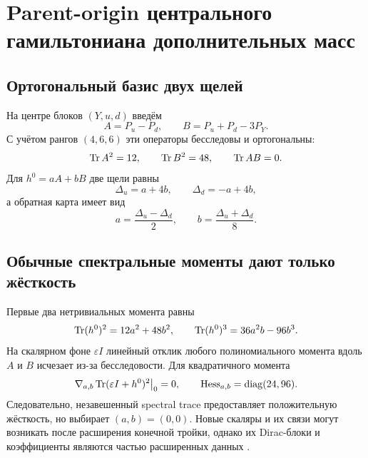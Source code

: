 \chapter{Parent-origin центрального гамильтониана дополнительных масс}
\label{ch:v8-extra-mass-central-hamiltonian-parent-origin}

\section{Ортогональный базис двух щелей}

На центре блоков $(Y,u,d)$ введём
\begin{equation}
 A=P_u-P_d,\qquad B=P_u+P_d-3P_Y.
 \label{eq:v8-extra-mass-origin-basis}
\end{equation}
С учётом рангов $(4,6,6)$ эти операторы бесследовы и ортогональны:
\begin{equation}
 \operatorname{Tr} A^2=12,\qquad \operatorname{Tr} B^2=48,\qquad \operatorname{Tr} AB=0.
 \label{eq:v8-extra-mass-origin-gram}
\end{equation}
Для $h^0=aA+bB$ две щели равны
\begin{equation}
 \Delta_u=a+4b,\qquad \Delta_d=-a+4b,
 \label{eq:v8-extra-mass-origin-gap-map}
\end{equation}
а обратная карта имеет вид
\begin{equation}
 a=\frac{\Delta_u-\Delta_d}{2},\qquad
 b=\frac{\Delta_u+\Delta_d}{8}.
 \label{eq:v8-extra-mass-origin-gap-inverse}
\end{equation}

\section{Обычные спектральные моменты дают только жёсткость}

Первые два нетривиальных момента равны
\begin{equation}
 \operatorname{Tr}(h^0)^2=12a^2+48b^2,
 \qquad
 \operatorname{Tr}(h^0)^3=36a^2b-96b^3.
 \label{eq:v8-extra-mass-origin-moments}
\end{equation}
На скалярном фоне $\varepsilon I$ линейный отклик любого полиномиального
момента вдоль $A$ и $B$ исчезает из-за бесследовости. Для квадратичного
момента
\begin{equation}
 \nabla_{a,b}\operatorname{Tr}(\varepsilon I+h^0)^2\big|_0=0,
 \qquad
 \operatorname{Hess}_{a,b}=\operatorname{diag}(24,96).
 \label{eq:v8-extra-mass-origin-quadratic-stiffness}
\end{equation}
Следовательно, незавешенный spectral trace предоставляет положительную
жёсткость, но выбирает $(a,b)=(0,0)$. Новые скаляры и их связи могут
возникать после расширения конечной тройки, однако их Dirac-блоки и
коэффициенты являются частью расширенных данных
\cite{v8-extra-mass-origin-stephan,v8-extra-mass-origin-krajewski}.

